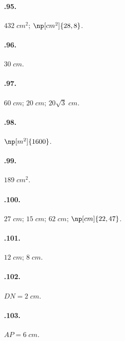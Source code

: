 \begin{multicols}{2}
\paragraph{\thechapter.95.}
$432\;\unit{cm^2}$; $\np[cm^2]{28,8}$.

\paragraph{\thechapter.96.}
$30\;\unit{cm}$.

\paragraph{\thechapter.97.}
$60\;\unit{cm}$; $20\;\unit{cm}$; $20\sqrt{3}\;\unit{cm}$.

\paragraph{\thechapter.98.}
$\np[m^2]{1600}$.

\paragraph{\thechapter.99.}
$189\;\unit{cm^2}$.

\paragraph{\thechapter.100.}
$27\;\unit{cm}$; $15\;\unit{cm}$; $62\;\unit{cm}$; $\np[cm]{22,47}$.

\paragraph{\thechapter.101.}
$12\;\unit{cm}$; $8\;\unit{cm}$.

\paragraph{\thechapter.102.}
$DN=2\;\unit{cm}$.

\paragraph{\thechapter.103.}
$AP=6\;\unit{cm}$.

\end{multicols}

